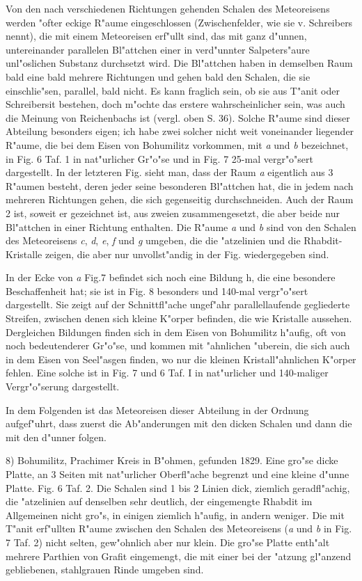 \documentclass[a4paper, 11pt, oneside]{article}
\begin{document}
Von den nach verschiedenen Richtungen gehenden Schalen des Meteoreisens werden "ofter eckige R"aume eingeschlossen (Zwischenfelder, wie sie v. Schreibers nennt), die mit einem Meteoreisen erf"ullt sind, das mit ganz d"unnen, untereinander parallelen Bl"attchen einer in verd"unnter Salpeters"aure unl"oslichen Substanz durchsetzt wird. Die Bl"attchen haben in demselben Raum bald eine bald mehrere Richtungen und gehen bald den Schalen, die sie einschlie"sen, parallel, bald nicht. Es kann fraglich sein, ob sie aus T"anit oder Schreibersit bestehen, doch m"ochte das erstere wahrscheinlicher sein, was auch die Meinung von Reichenbachs ist (vergl. oben S. 36). Solche R"aume sind dieser Abteilung besonders eigen; ich habe zwei solcher nicht weit voneinander liegender R"aume, die bei dem Eisen von Bohumilitz vorkommen, mit \emph{a} und \emph{b} bezeichnet, in Fig. 6 Taf. 1 in nat"urlicher Gr"o"se und in Fig. 7 25-mal vergr"o"sert dargestellt. In der letzteren Fig. sieht man, dass der Raum \emph{a} eigentlich aus 3 R"aumen besteht, deren jeder seine besonderen Bl"attchen hat, die in jedem nach mehreren Richtungen gehen, die sich gegenseitig durchschneiden. Auch der Raum 2 ist, soweit er gezeichnet ist, aus zweien zusammengesetzt, die aber beide nur Bl"attchen in einer Richtung enthalten. Die R"aume \emph{a} und \emph{b} sind von den Schalen des Meteoreisens \emph{c}, \emph{d}, \emph{e}, \emph{f} und \emph{g} umgeben, die die "atzelinien und die Rhabdit-Kristalle zeigen, die aber nur unvollst"andig in der Fig. wiedergegeben sind.

In der Ecke von \emph{a} Fig.7 befindet sich noch eine Bildung h, die eine besondere Beschaffenheit hat; sie ist in Fig. 8 besonders und 140-mal vergr"o"sert dargestellt. Sie zeigt auf der Schnittfl"ache ungef"ahr parallellaufende gegliederte Streifen, zwischen denen sich kleine K"orper befinden, die wie Kristalle aussehen. Dergleichen Bildungen finden sich in dem Eisen von Bohumilitz h"aufig, oft von noch bedeutenderer Gr"o"se, und kommen mit "ahnlichen "uberein, die sich auch in dem Eisen von Seel"asgen finden, wo nur die kleinen Kristall"ahnlichen K"orper fehlen. Eine solche ist in Fig. 7 und 6 Taf. I in nat"urlicher und 140-maliger Vergr"o"serung dargestellt.

In dem Folgenden ist das Meteoreisen dieser Abteilung in der Ordnung aufgef"uhrt, dass zuerst die Ab"anderungen mit den dicken Schalen und dann die mit den d"unner folgen.

8) Bohumilitz, Prachimer Kreis in B"ohmen, gefunden 1829. Eine gro"se dicke Platte, an 3 Seiten mit nat"urlicher Oberfl"ache begrenzt und eine kleine d"unne Platte. Fig. 6 Taf. 2. Die Schalen sind 1 bis 2 Linien dick, ziemlich geradfl"achig, die "atzelinien auf denselben sehr deutlich, der eingemengte Rhabdit im Allgemeinen nicht gro"s, in einigen ziemlich h"aufig, in andern weniger. Die mit T"anit erf"ullten R"aume zwischen den Schalen des Meteoreisens (\emph{a} und \emph{b} in Fig. 7 Taf. 2) nicht selten, gew"ohnlich aber nur klein. Die gro"se Platte enth"alt mehrere Parthien von Grafit eingemengt, die mit einer bei der "atzung gl"anzend gebliebenen, stahlgrauen Rinde umgeben sind.
\end{document}
